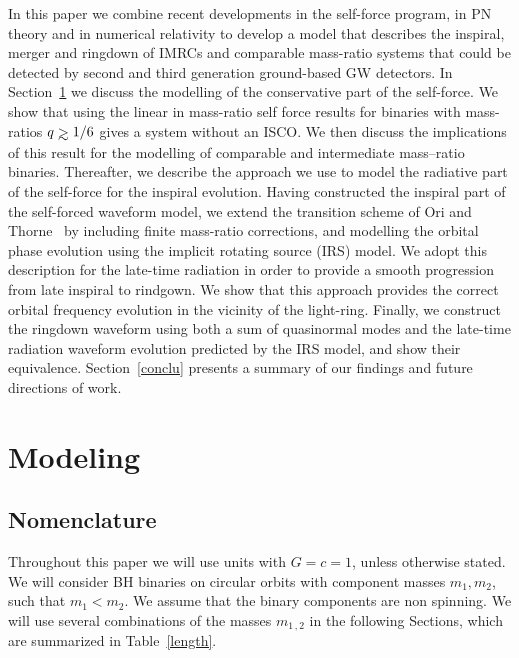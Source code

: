 \documentclass[aps,prd,showpacs,amssymb,floatfix,nofootinbib,superscriptaddress]{revtex4-1}%
\def\gtrsim{\mathrel{\hbox{\rlap{\hbox{\lower4pt\hbox{$\sim$}}}\hbox{$>$}}}}
\begin{document}
In this paper we combine recent developments in the self-force program, in PN theory and in numerical relativity to develop a model that describes the inspiral, merger and ringdown of IMRCs and comparable mass-ratio systems that could be detected by second and third generation ground-based GW detectors. In Section~\ref{one} we discuss the modelling of the conservative part of the self-force. We show that using the linear in mass-ratio self force results for binaries with mass-ratios \(q\gtrsim1/6\) gives a system without an ISCO. We then discuss the implications of this result for the modelling of comparable and intermediate mass--ratio binaries.  Thereafter, we describe the approach we use to model the radiative part of the self-force for the inspiral evolution. Having constructed the inspiral part of the self-forced waveform model, we extend the transition scheme of  Ori and Thorne~\cite{ori} by including finite mass-ratio corrections, and modelling the orbital phase evolution using the implicit rotating source (IRS) model. We adopt this description for the late-time radiation in order to provide a smooth progression from late inspiral to rindgown.  We show that this approach provides the correct orbital frequency evolution in the vicinity of the light-ring. Finally, we construct the ringdown waveform using both a sum of quasinormal modes and the late-time radiation waveform evolution predicted by the IRS model, and show their equivalence. Section~\ref{conclu} presents a summary of our findings and future directions of work. 


\section{Modeling}
\label{one}


\subsection{Nomenclature}
Throughout this paper we will use units with \(G=c=1\), unless otherwise stated. We will consider BH  binaries on circular orbits with component masses \(m_1, m_2\), such that \(m_1 < m_2\). We assume that the binary components are non spinning. We will use several combinations of the masses \(m_{1\, ,2}\) in the following Sections, which are summarized in Table~\ref{length}.
\end{document}
